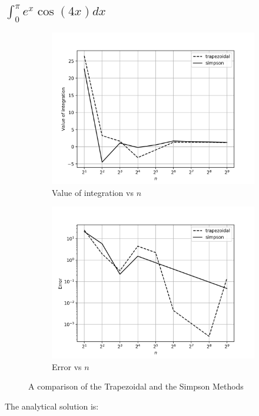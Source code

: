 \documentclass[12,a4paper]{article}
\begin{document}
    \subsection{$\int_0^\pi e^{x}\cos({4x}) dx$}
    \begin{figure}[h!]
        \centering
        \begin{subfigure}[t]{0.49\textwidth}
            \includegraphics[width=\textwidth]{plots/q1a.png}
            \caption{Value of integration vs $n$}
            \label{fig:sq3a}
        \end{subfigure}
        \begin{subfigure}[t]{0.49\textwidth}
            \includegraphics[width=\textwidth]{plots/q1b.png}
            \caption{Error vs $n$}
            \label{fig:q3b}
        \end{subfigure}
        \caption{A comparison of the Trapezoidal and the Simpson Methods}
    \end{figure}
    The analytical solution is:
    
\end{document}
